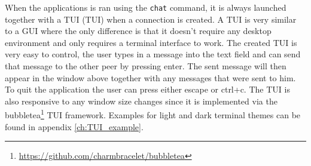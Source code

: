 When the applications is ran using the \texttt{chat} command, it is always launched together with a TUI (\acl{TUI}) when a connection is created. A TUI is very similar to a GUI where the only difference is that it doesn't require any desktop environment and only requires a terminal interface to work. The created TUI is very easy to control, the user types in a message into the text field and can send that message to the other peer by pressing enter. The sent message will then appear in the window above together with any messages that were sent to him. To quit the application the user can press either escape or ctrl+c. The TUI is also responsive to any window size changes since it is implemented via the bubbletea\footnote{\url{https://github.com/charmbracelet/bubbletea}} TUI framework. Examples for light and dark terminal themes can be found in appendix \ref{ch:TUI_example}.
